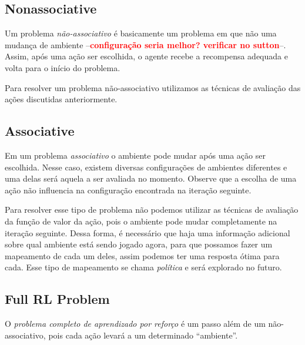 \documentclass{article}
\newcommand{\todo}[1]{ --\textcolor{red}{\textbf{#1}}--}
\begin{document}
        \subsection{Nonassociative}
        
            Um problema \emph{não-associativo} é basicamente um problema em que não uma mudança de ambiente \todo{configuração seria melhor? verificar no sutton}. Assim, após uma ação ser escolhida, o agente recebe a recompensa adequada e volta para o início do problema. 
            
            \begin{center}
                \simplebandit
            \end{center}
            
            Para resolver um problema não-associativo utilizamos as técnicas de avaliação das ações discutidas anteriormente.
    
        \subsection{Associative}
        
            Em um problema \emph{associativo} o ambiente pode mudar após uma ação ser escolhida. Nesse caso, existem diversas configurações de ambientes diferentes e uma delas será aquela a ser avaliada no momento. Observe que a escolha de uma ação não influencia na configuração encontrada na iteração seguinte.
    
            \begin{center}
                \associativebandits
            \end{center}
            
            Para resolver esse tipo de problema não podemos utilizar as técnicas de avaliação da função de valor da ação, pois o ambiente pode mudar completamente na iteração seguinte. Dessa forma, é necessário que haja uma informação adicional sobre qual ambiente está sendo jogado agora, para que possamos fazer um mapeamento de cada um deles, assim podemos ter uma resposta ótima para cada. Esse tipo de mapeamento se chama \emph{política} e será explorado no futuro.
            
        \subsection{Full RL Problem}
        
            O \emph{problema completo de aprendizado por reforço} é um passo além de um não-associativo, pois cada ação levará a um determinado ``ambiente''. 
        
\end{document}

